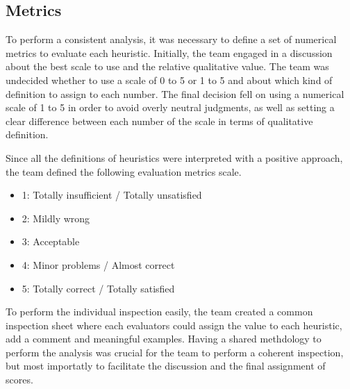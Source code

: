 
\subsection{Metrics}

To perform a consistent analysis, it was necessary to define a set of numerical metrics to evaluate each heuristic.
Initially, the team engaged in a discussion about the best scale to use and the relative qualitative value. The team was undecided whether to use a scale of 0 to 5 or 1 to 5 and about which kind of definition to assign to each number.
The final decision fell on using a numerical scale of 1 to 5 in order to avoid overly neutral judgments, as well as setting a clear difference between each number of the scale in terms of qualitative definition. 

Since all the definitions of heuristics were interpreted with a positive approach, the team defined the following evaluation metrics scale.
\begin{itemize}
    \item 1: Totally insufficient / Totally unsatisfied
    \item 2: Mildly wrong
    \item 3: Acceptable
    \item 4: Minor problems / Almost correct
    \item 5: Totally correct / Totally satisfied
\end{itemize}

To perform the individual inspection easily, the team created a common inspection sheet where each evaluators could assign the value to each heuristic, add a comment and meaningful examples. Having a shared methdology to perform the analysis was crucial for the team to perform a coherent inspection, but most importatly to facilitate the discussion and the final assignment of scores.